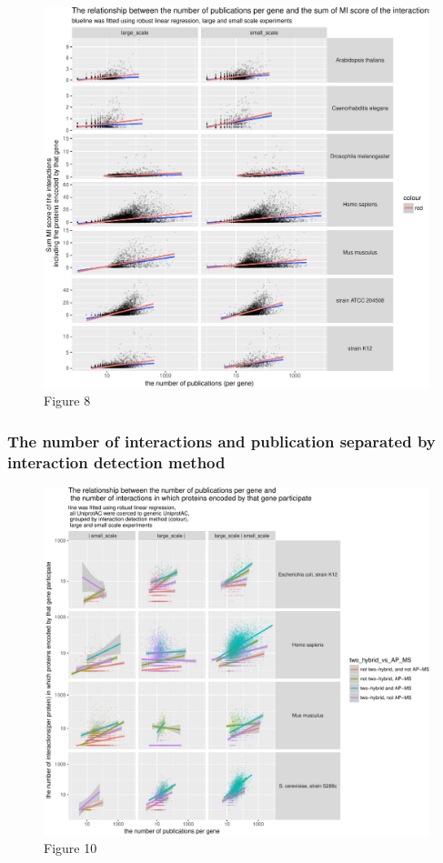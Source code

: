 \documentclass[]{article}
\begin{document}
\begin{figure}[htbp]
\centering
\includegraphics{final_report_files/figure-latex/N_publications_vs_recalculated_MI_score_sum-1.pdf}
\caption{Figure 8}
\end{figure}

\subsubsection{The number of interactions and publication separated by
interaction detection
method}\label{the-number-of-interactions-and-publication-separated-by-interaction-detection-method}

\begin{figure}[htbp]
\centering
\includegraphics{final_report_files/figure-latex/interaction_properties_vs_pubN-1.pdf}
\caption{Figure 10}
\end{figure}
\end{document}
